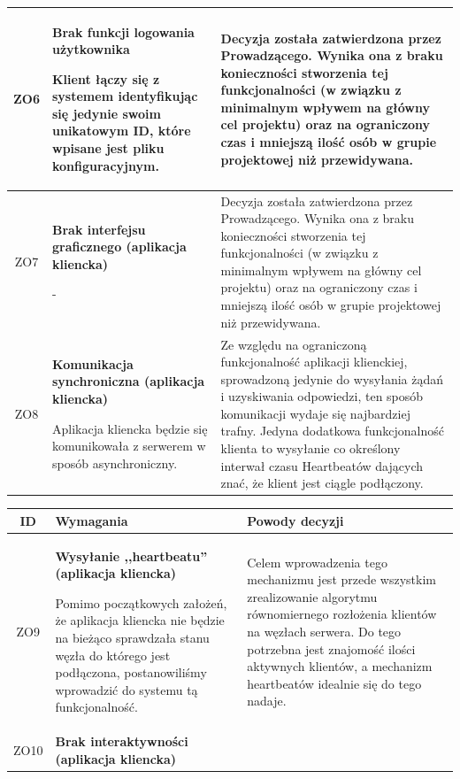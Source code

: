 {\begin{tabularx}{\textwidth}{|c|X|X|}
\label{z:ZO6} ZO6 &  \textbf{Brak funkcji logowania użytkownika}

Klient łączy się z systemem identyfikując się jedynie swoim unikatowym ID, które wpisane jest pliku konfiguracyjnym. & 
Decyzja została zatwierdzona przez Prowadzącego. Wynika ona z braku konieczności stworzenia tej funkcjonalności (w związku z minimalnym wpływem na główny cel projektu) oraz na ograniczony czas i mniejszą ilość osób w grupie projektowej niż przewidywana.  \\
\hline

\label{z:ZO7} ZO7 &  \textbf{Brak interfejsu graficznego (aplikacja kliencka)}

- & 
Decyzja została zatwierdzona przez Prowadzącego. Wynika ona z braku konieczności stworzenia tej funkcjonalności (w związku z minimalnym wpływem na główny cel projektu) oraz na ograniczony czas i mniejszą ilość osób w grupie projektowej niż przewidywana.
\\
\hline
\label{z:ZO8} ZO8 &  \textbf{Komunikacja synchroniczna (aplikacja kliencka)}

Aplikacja kliencka będzie się komunikowała z serwerem w sposób asynchroniczny. & 
Ze względu na ograniczoną funkcjonalność aplikacji klienckiej, sprowadzoną jedynie do wysyłania żądań i uzyskiwania odpowiedzi, ten sposób komunikacji wydaje się najbardziej trafny. Jedyna dodatkowa funkcjonalność klienta to wysyłanie co określony interwał czasu Heartbeatów dających znać, że klient jest ciągle podłączony.\\
\hline

\end{tabularx}

\pagebreak

\begin{tabularx}{\textwidth}{|c|X|X|}
\hline
\textbf{ID} & \textbf{Wymagania}  & \textbf{Powody decyzji} \\
\hline
\label{z:ZO9} ZO9 &  \textbf{Wysyłanie ,,heartbeatu'' (aplikacja kliencka)}

Pomimo początkowych założeń, że aplikacja kliencka nie będzie na bieżąco sprawdzała stanu węzła do którego jest podłączona, postanowiliśmy wprowadzić do systemu tą funkcjonalność.  & 
Celem wprowadzenia tego mechanizmu jest przede wszystkim zrealizowanie algorytmu równomiernego rozłożenia klientów na węzłach serwera. Do tego potrzebna jest znajomość ilości aktywnych klientów, a mechanizm heartbeatów idealnie się do tego nadaje.\\
\hline

\label{z:ZO10} ZO10 &  \textbf{Brak interaktywności (aplikacja kliencka)}


\end{tabularx}}
